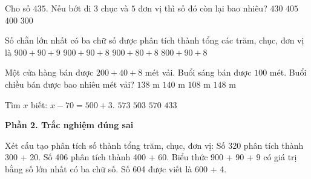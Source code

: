 \begin{ex} %
Cho số $435$. Nếu bớt đi $3$ chục và $5$ đơn vị thì số đó còn lại bao nhiêu?
\choice
{$430$}
{$405$}
{\True $400$}
{$300$}
\end{ex}

\begin{ex} %
Số chẵn lớn nhất có ba chữ số được phân tích thành tổng các trăm, chục, đơn vị là
\choice
{$900 + 90 + 9$}
{\True $900 + 90 + 8$}
{$900 + 80 + 8$}
{$800 + 90 + 8$}
\end{ex}

\begin{ex} %
Một cửa hàng bán được $200 + 40 + 8$ mét vải. Buổi sáng bán được $100$ mét. Buổi chiều bán được bao nhiêu mét vải?
\choice
{$138\text{ m}$}
{$140\text{ m}$}
{$108\text{ m}$}
{\True $148\text{ m}$}
\end{ex}

\begin{ex} %
Tìm $x$ biết: $x - 70 = 500 + 3$.
\choice
{\True $573$}
{$503$}
{$570$}
{$433$}
\end{ex}

\textbf{Phần 2. Trắc nghiệm đúng sai}

\begin{ex} %
Xét cấu tạo phân tích số thành tổng trăm, chục, đơn vị:
\choiceTF
{\True Số 320 phân tích thành 300 + 20.}
{Số 406 phân tích thành 400 + 60.}
{\True Biểu thức 900 + 90 + 9 có giá trị bằng số lớn nhất có ba chữ số.}
{\True Số 604 được viết là 600 + 4.}
\end{ex}

